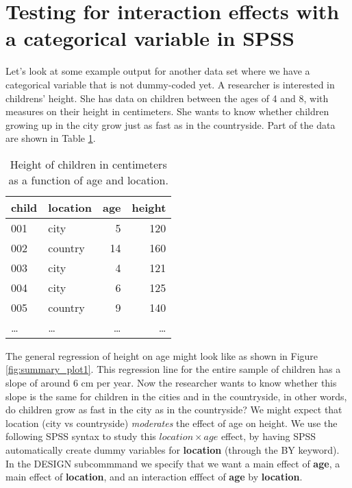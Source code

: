 \section{Testing for interaction effects with a categorical variable in SPSS}


Let's look at some example output for another data set where we have a categorical variable that is not dummy-coded yet. A researcher is interested in childrens' height. She has data on children between the ages of 4 and 8, with measures on their height in centimeters. She wants to know whether children growing up in the city grow just as fast as in the countryside. Part of the data are shown in Table \ref{tab:location}.
 
 
 
 \begin{table}
 \caption{Height of children in centimeters as a function of age and location.}
 \begin{tabular}{llrr}
 child & location & age & height\\ \hline
 001 & city & 5 & 120\\
 002 & country & 14 & 160\\
 003 & city & 4 & 121\\
 004 & city & 6 & 125\\
 005 & country & 9 & 140\\
 \dots & \dots & \dots & \dots\\
 \end{tabular}
 \label{tab:location}
 \end{table}



\begin{knitrout}
\color{fgcolor}\begin{kframe}


{\ttfamily\noindent\bfseries{}}\end{kframe}
\end{knitrout}

The general regression of height on age might look like as shown in Figure \ref{fig:summary_plot1}. This regression line for the entire sample of children has a slope of around 6 cm per year. Now the researcher wants to know whether this slope is the same for children in the cities and in the countryside, in other words, do children grow as fast in the city as in the countryside? We might expect that location (city vs countryside) \textit{moderates} the effect of age on height. We use the following SPSS syntax to study this $location \times age$ effect, by having SPSS automatically create dummy variables for \textbf{location} (through the BY keyword). In the DESIGN subcommmand we specify that we want a main effect of \textbf{age}, a main effect of \textbf{location}, and an interaction efffect of \textbf{age} by \textbf{location}. 

